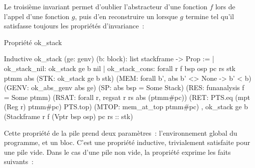 \documentclass{article}
\begin{document}
Le troisième invariant permet d'oublier l'abstracteur d'une fonction $f$ lors
de l'appel d'une fonction $g$, puis d'en reconstruire un lorsque $g$ termine
tel qu'il satisfasse toujours les propriétés d'invariance~:

\begin{coqcode}
\caption{Propriété ok\_stack}
\begin{english}
\begin{coq}
Inductive ok_stack (ge: genv) (b: block): list stackframe -> Prop :=
| ok_stack_nil:
ok_stack ge b nil
| ok_stack_cons: forall r f bsp osp pc rs stk ptmm abs
(STK:  ok_stack ge b stk)
(MEM:  forall b', abs b' <> None -> b' < b)
(GENV: ok_abs_genv abs ge)
(SP:   abs bsp = Some Stack)
(RES:  funanalysis f = Some ptmm)
(RSAT: forall r, regsat r rs abs (ptmm#pc))
(RET:  PTS.eq (mpt (Reg r) ptmm#pc) PTS.top)
(MTOP: mem_at_top ptmm#pc)
,
ok_stack ge b (Stackframe r f (Vptr bsp osp) pc rs :: stk)
\end{coq}
\end{english}
\end{coqcode}

Cette propriété de la pile prend deux paramètres~: l'environnement global du
programme, et un bloc. C'est une propriété inductive, trivialement satisfaite
pour une pile vide. Dans le cas d'une pile non vide, la propriété exprime les
faits suivants~:
\end{document}
